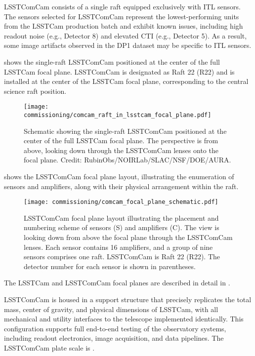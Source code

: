 LSSTComCam consists of a single raft equipped exclusively with \gls{ITL} sensors.
The sensors selected for \gls{LSSTComCam} represent the lowest-performing units from the LSSTCam production batch and exhibit known issues, including high readout noise (e.g., Detector 8) and elevated \gls{CTI} (e.g., Detector 5).
As a result, some image artifacts observed in the \gls{DP1} dataset may be specific to \gls{ITL} sensors.

 shows the single-raft \gls{LSSTComCam} positioned at the center of the full LSSTCam focal plane.
\gls{LSSTComCam} is designated as Raft 22 (R22) and is installed at the center of the \gls{LSSTCam} focal plane, corresponding to the central science raft position.
\begin{figure}[htb]
\centering
\texttt{[image: commissioning/comcam\_raft\_in\_lsstcam\_focal\_plane.pdf]}
\caption{Schematic showing the single-raft \gls{LSSTComCam} positioned at the center of the full LSSTCam focal plane. The perspective is from above, looking down through the \gls{LSSTComCam} lenses onto the focal plane. Credit: RubinObs/NOIRLab/SLAC/NSF/DOE/AURA.}
\label{fig:comcam_raft_in_lsstcam_focal_plane}
\vspace{0.1cm}
\end{figure}

 shows the \gls{LSSTComCam} focal plane layout, illustrating the enumeration of sensors and amplifiers, along with their physical arrangement within the raft.
\begin{figure}[htb!]
\centering
\texttt{[image: commissioning/comcam\_focal\_plane\_schematic.pdf]}
\caption{LSSTComCam focal plane layout illustrating the placement and numbering scheme of sensors (S) and amplifiers (C). The view is looking down from above the focal plane through the \gls{LSSTComCam} lenses. Each sensor contains 16 amplifiers, and a group of nine sensors comprises one raft. \gls{LSSTComCam} is Raft 22 (R22). The detector number for each sensor is shown in parentheses.}
\label{fig:comcam_focal_plane}
\vspace{0.1cm}
\end{figure}
The LSSTCam and \gls{LSSTComCam} focal planes are described in detail in \cite{ctn001}.

\gls{LSSTComCam} is housed in a support structure that precisely replicates the total mass, center of gravity, and physical dimensions of \gls{LSSTCam}, with all mechanical and utility interfaces to the telescope implemented identically.
This \gls{configuration} supports full end-to-end testing of the observatory systems, including readout electronics, image acquisition, and data pipelines.
The \gls{LSSTComCam} plate scale is \rawplatescale.

